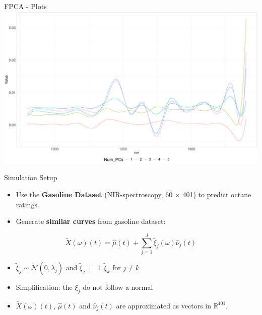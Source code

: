 \documentclass{beamer}
\newcommand{\independent}{\perp\!\!\!\!\perp}
\begin{document}
	\begin{frame}{FPCA - Plots}
			\includegraphics[width = \textwidth]{../Graphics/pc_approx.pdf}
	\end{frame}
	

	\begin{frame}{Simulation Setup}
		\begin{itemize}
			\item Use the \textbf{Gasoline Dataset} (NIR-spectroscopy, 60 $\times$ 401) to predict octane ratings.
			\item Generate \textbf{similar curves} from gasoline dataset:
		\end{itemize}
	
		$$\tilde{X}(\omega)(t) = \hat{\mu}(t) + \sum_{j = 1}^{J} \tilde{\xi}_j(\omega) \hat{\nu}_j(t)$$ 

		\begin{itemize}
			\item $\tilde{\xi}_{j} \sim \mathcal{N}(0,\hat{\lambda}_j)$ and $\tilde{\xi}_{j} \independent \tilde{\xi}_{k}$ for $j \neq k$
			\item Simplification: the $\xi_{j}$ do not follow a normal
			\item $\tilde{X}(\omega)(t)$, $\hat{\mu}(t)$ and $\hat{\nu}_j(t)$ are approximated as vectors in $\mathbb{R}^{401}$.
		\end{itemize}
		
	\end{frame}
	
\end{document}

